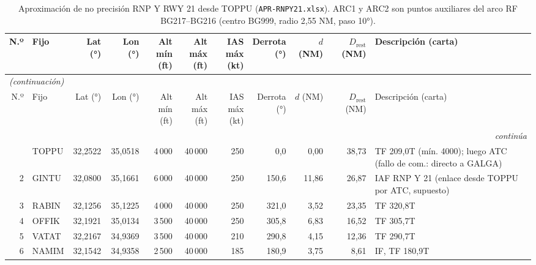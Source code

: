 \begingroup\scriptsize\setlength{\tabcolsep}{2.8pt}
\begin{longtable}{rlrrrrrrrr>{\raggedright\arraybackslash}p{3.4cm}}
\caption{Aproximación de no precisión RNP Y RWY 21 desde TOPPU (\texttt{APR-RNPY21.xlsx}). ARC1 y ARC2 son puntos auxiliares del arco RF BG217--BG216 (centro BG999, radio 2,55 NM, paso 10°).}\label{tab:rnp}\\
\toprule
N.º & Fijo & Lat (°) & Lon (°) & \makecell{Alt mín\\(ft)} & \makecell{Alt máx\\(ft)} & \makecell{IAS máx\\(kt)} & \makecell{Derrota\\(°)} & \makecell{$d$\\(NM)} & \makecell{$D_{\mathrm{rest}}$\\(NM)} & Descripción (carta)\\
\midrule
\endfirsthead
\multicolumn{11}{l}{\small\itshape (continuación)}\\
\toprule
N.º & Fijo & Lat (°) & Lon (°) & \makecell{Alt mín\\(ft)} & \makecell{Alt máx\\(ft)} & \makecell{IAS máx\\(kt)} & \makecell{Derrota\\(°)} & \makecell{$d$\\(NM)} & \makecell{$D_{\mathrm{rest}}$\\(NM)} & Descripción (carta)\\
\midrule
\endhead
\midrule
\multicolumn{11}{r}{\small\itshape continúa}\\
\endfoot
\bottomrule
\endlastfoot
1 & TOPPU & 32,2522 & 35,0518 & 4\,000 & 40\,000 & 250 & 0,0 & 0,00 & 38,73 & \scriptsize TF 209,0T (mín. 4000); luego ATC (fallo de com.: directo a GALGA)\\
2 & GINTU & 32,0800 & 35,1661 & 6\,000 & 40\,000 & 250 & 150,6 & 11,86 & 26,87 & \scriptsize IAF RNP Y 21 (enlace desde TOPPU por ATC, supuesto)\\
3 & RABIN & 32,1256 & 35,1225 & 4\,000 & 40\,000 & 250 & 321,0 & 3,52 & 23,35 & \scriptsize TF 320,8T\\
4 & OFFIK & 32,1921 & 35,0134 & 3\,500 & 40\,000 & 250 & 305,8 & 6,83 & 16,52 & \scriptsize TF 305,7T\\
5 & VATAT & 32,2167 & 34,9369 & 3\,500 & 40\,000 & 210 & 290,8 & 4,15 & 12,36 & \scriptsize TF 290,7T\\
6 & NAMIM & 32,1542 & 34,9358 & 2\,500 & 40\,000 & 185 & 180,9 & 3,75 & 8,61 & \scriptsize IF, TF 180,9T\\

\end{longtable}
